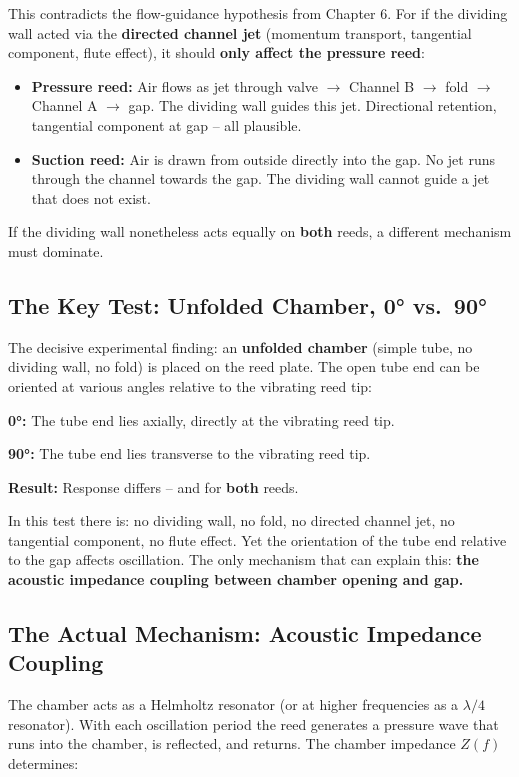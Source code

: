 \documentclass[11pt,a4paper]{article}
\begin{document}
This contradicts the flow-guidance hypothesis from Chapter 6. For if the dividing wall acted via the \textbf{directed channel jet} (momentum transport, tangential component, flute effect), it should \textbf{only affect the pressure reed}:

\begin{itemize}[leftmargin=5mm, itemsep=1pt]
\item \textbf{Pressure reed:} Air flows as jet through valve $\to$ Channel B $\to$ fold $\to$ Channel A $\to$ gap. The dividing wall guides this jet. Directional retention, tangential component at gap -- all plausible.
\item \textbf{Suction reed:} Air is drawn from outside directly into the gap. No jet runs through the channel towards the gap. The dividing wall cannot guide a jet that does not exist.
\end{itemize}

If the dividing wall nonetheless acts equally on \textbf{both} reeds, a different mechanism must dominate.

\subsection{The Key Test: Unfolded Chamber, 0° vs.\ 90°}

The decisive experimental finding: an \textbf{unfolded chamber} (simple tube, no dividing wall, no fold) is placed on the reed plate. The open tube end can be oriented at various angles relative to the vibrating reed tip:

\textbf{0°:} The tube end lies axially, directly at the vibrating reed tip.

\textbf{90°:} The tube end lies transverse to the vibrating reed tip.

\textbf{Result:} Response differs -- and for \textbf{both} reeds.

In this test there is: no dividing wall, no fold, no directed channel jet, no tangential component, no flute effect. Yet the orientation of the tube end relative to the gap affects oscillation. The only mechanism that can explain this: \textbf{the acoustic impedance coupling between chamber opening and gap.}

\subsection{The Actual Mechanism: Acoustic Impedance Coupling}

The chamber acts as a Helmholtz resonator (or at higher frequencies as a $\lambda/4$\,resonator). With each oscillation period the reed generates a pressure wave that runs into the chamber, is reflected, and returns. The chamber impedance $Z(f)$ determines:
\end{document}
